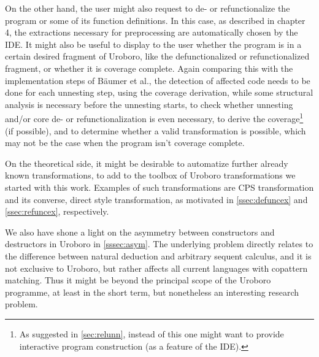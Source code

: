 On the other hand, the user might also request to de- or refunctionalize the program or some of its function definitions. In this case, as described in chapter 4, the extractions necessary for preprocessing are automatically chosen by the IDE. It might also be useful to display to the user whether the program is in a certain desired fragment of Uroboro, like the defunctionalized or refunctionalized fragment, or whether it is coverage complete. Again comparing this with the implementation steps of Bäumer et al., the detection of affected code needs to be done for each unnesting step, using the coverage derivation, while some structural analysis is necessary before the unnesting starts, to check whether unnesting and/or core de- or refunctionalization is even necessary, to derive the coverage\footnote{As suggested in \autoref{sec:relunn}, instead of this one might want to provide interactive program construction (as a feature of the IDE).} (if possible), and to determine whether a valid transformation is possible, which may not be the case when the program isn't coverage complete.

On the theoretical side, it might be desirable to automatize further already known transformations, to add to the toolbox of Uroboro transformations we started with this work. Examples of such transformations are CPS transformation and its converse, direct style transformation, as motivated in \autoref{ssec:defuncex} and \autoref{ssec:refuncex}, respectively.

We also have shone a light on the asymmetry between constructors and destructors in Uroboro in \autoref{sssec:asym}. The underlying problem directly relates to the difference between natural deduction and arbitrary sequent calculus, and it is not exclusive to Uroboro, but rather affects all current languages with copattern matching. Thus it might be beyond the principal scope of the Uroboro programme, at least in the short term, but nonetheless an interesting research problem.
